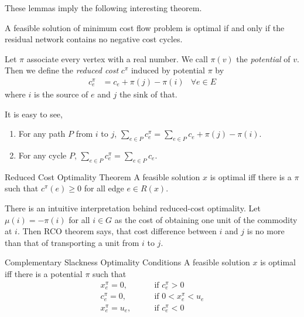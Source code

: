 \documentclass[UTF8,a4paper]{ctexart}
\begin{document}
These lemmas imply the following interesting theorem.

\begin{theorem}
    A feasible solution of minimum cost flow problem is optimal if and only if the residual network contains no negative cost cycles.
\end{theorem}

\begin{definition}
    Let $\pi$ associate every vertex with a real number.
    We call $\pi(v)$ the \emph{potential} of $v$.
    Then we define the \emph{reduced cost} $c^\pi$ induced by potential $\pi$ by
    \begin{align}
        c^\pi_e&=c_e + \pi(j) - \pi(i) &\forall e\in E
    \end{align}
    where $i$ is the source of $e$ and $j$ the sink of that.

    It is easy to see,
    \begin{enumerate}
        \item For any path $P$ from $i$ to $j$, $\sum_{e\in P}c^\pi_e = \sum_{e\in P}c_e + \pi(j) - \pi(i)$.
        \item For any cycle $P$, $\sum_{e\in P}c^\pi_e = \sum_{e\in P} c_e$.
    \end{enumerate}
\end{definition}

\begin{theorem}{Reduced Cost Optimality Theorem}
    A feasible solution $x$ is optimal iff there is a $\pi$ such that $c^\pi(e)\geq 0$ for all edge $e\in R(x)$.
\end{theorem}

There is an intuitive interpretation behind reduced-cost optimality.
Let $\mu(i)=-\pi(i)$ for all $i\in G$ as the cost of obtaining one unit of the commodity at $i$.
Then RCO theorem says, that cost difference between $i$ and $j$ is no more than that of transporting a unit from $i$ to $j$.

\begin{theorem}{Complementary Slackness Optimality Conditions}
    A feasible solution $x$ is optimal iff
    there is a potential $\pi$ such that
    \begin{align}
        x^\pi_e =0, &\qquad\text{if }c^\pi_e > 0\\
        c^\pi_e = 0, &\qquad\text{if }0 < x^\pi_e < u_e\\
        x^\pi_e = u_e, &\qquad\text{if }c^\pi_e < 0
    \end{align}
\end{theorem}
\end{document}
